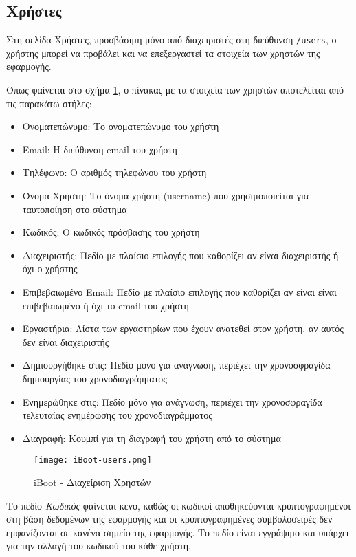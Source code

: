 \subsection{Χρήστες}
\FloatBarrier
Στη σελίδα Χρήστες, προσβάσιμη μόνο από διαχειριστές στη διεύθυνση \verb!/users!, ο χρήστης μπορεί να προβάλει και να επεξεργαστεί τα στοιχεία των χρηστών της εφαρμογής.

Όπως φαίνεται στο σχήμα \ref{fig:iBoot_users}, ο πίνακας με τα στοιχεία των χρηστών αποτελείται από τις παρακάτω στήλες:
\begin{itemize}
	\item Ονοματεπώνυμο: Το ονοματεπώνυμο του χρήστη
	\item Email: Η διεύθυνση email του χρήστη
	\item Τηλέφωνο: Ο αριθμός τηλεφώνου του χρήστη
	\item Όνομα Χρήστη: Το όνομα χρήστη (username) που χρησιμοποιείται για ταυτοποίηση στο σύστημα
	\item Κωδικός: Ο κωδικός πρόσβασης του χρήστη
	\item Διαχειριστής: Πεδίο με πλαίσιο επιλογής που καθορίζει αν είναι διαχειριστής ή όχι ο χρήστης
	\item Επιβεβαιωμένο Email: Πεδίο με πλαίσιο επιλογής που καθορίζει αν είναι είναι επιβεβαιωμένο ή όχι το email του χρήστη
	\item Εργαστήρια: Λίστα των εργαστηρίων που έχουν ανατεθεί στον χρήστη, αν αυτός δεν είναι διαχειριστής
	\item Δημιουργήθηκε στις: Πεδίο μόνο για ανάγνωση, περιέχει την χρονοσφραγίδα δημιουργίας του χρονοδιαγράμματος
	\item Ενημερώθηκε στις: Πεδίο μόνο για ανάγνωση, περιέχει την χρονοσφραγίδα τελευταίας ενημέρωσης του χρονοδιαγράμματος
	\item Διαγραφή: Κουμπί για τη διαγραφή του χρήστη από το σύστημα
\end{itemize}

\begin{figure}[ht]
	\centering
	\texttt{[image: iBoot-users.png]}
	\caption{iBoot - Διαχείριση Χρηστών}
	\label{fig:iBoot_users}
\end{figure}
Το πεδίο \emph{Κωδικός} φαίνεται κενό, καθώς οι κωδικοί αποθηκεύονται κρυπτογραφημένοι στη βάση δεδομένων της εφαρμογής και οι κρυπτογραφημένες συμβολοσειρές δεν εμφανίζονται σε κανένα σημείο της εφαρμογής. Το πεδίο είναι εγγράψιμο και υπάρχει για την αλλαγή του κωδικού του κάθε χρήστη.
\FloatBarrier

